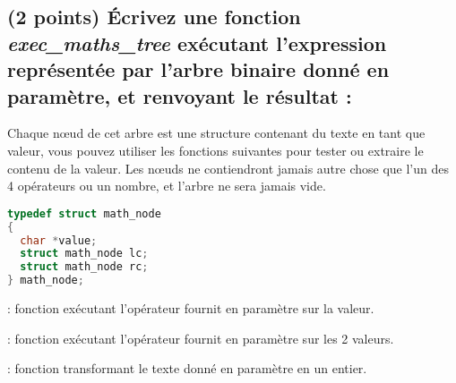 \documentclass[11pt,a4paper]{article}
\begin{document}
\vspace*{3cm}


\clearpage


\subsection{(2 points) \'Ecrivez une fonction \og \textit{exec\_maths\_tree} \fg{} exécutant l'expression représentée par l'arbre binaire donné en paramètre, et renvoyant le résultat : }

\noindent Chaque nœud de cet arbre est une structure contenant du texte en tant que valeur, vous pouvez utiliser les fonctions suivantes pour tester ou extraire le contenu de la valeur.
Les nœuds ne contiendront jamais autre chose que l'un des 4 opérateurs ou un nombre, et l'arbre ne sera jamais vide.

\vspace*{-0.5cm}

\begin{center}

\begin{table}[ht!]
  \centering
  \begin{minipage}{0.38\textwidth}
    \centering

\begin{lstlisting}[language=C]
typedef struct math_node
{
  char *value;
  struct math_node lc;
  struct math_node rc;
} math_node; \end{lstlisting}

  \end{minipage}
  \hfillx
  \begin{minipage}{0.57\textwidth}

\noindent {} : fonction exécutant l'opérateur fournit en paramètre sur la valeur.

\smallskip

\noindent {} : fonction exécutant l'opérateur fournit en paramètre sur les 2 valeurs.

\smallskip

\noindent {} : fonction transformant le texte donné en paramètre en un entier.

  \end{minipage}
\end{table}

\end{center}
\end{document}
